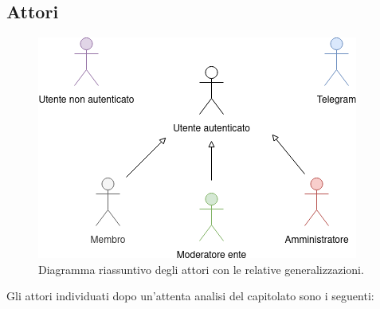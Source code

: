 	\subsection{Attori}

		\begin{figure}[t!]
			\centering
			\includegraphics[scale=0.75]{res/images/attori}
			\caption{Diagramma riassuntivo degli attori con le relative generalizzazioni.}
		\end{figure}

		Gli attori individuati dopo un'attenta analisi del capitolato sono i seguenti:

